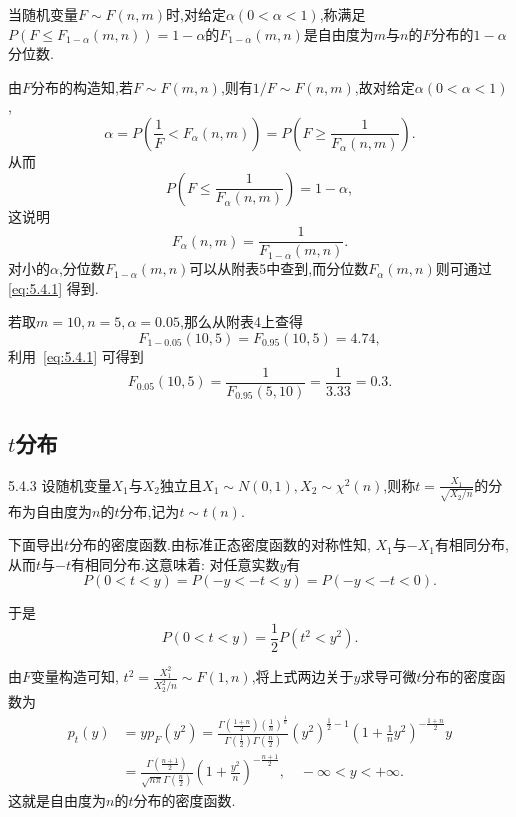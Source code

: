 当随机变量$F\sim F(n,m)$时,对给定$\alpha(0<\alpha<1)$,称满足$P(F\leq F_{1-\alpha}(m,n))=1-\alpha$的$F_{1-\alpha}(m,n)$是自由度为$m$与$n$的$F$分布的$1-\alpha$分位数.

由$F$分布的构造知,若$F\sim F(m,n)$,则有$1/F\sim F(n,m)$,故对给定$\alpha(0<\alpha<1)$,
\[
\alpha =P\left( \frac{1}{F}<F_{\alpha}\left( n,m \right) \right) =P\left( F\geq \frac{1}{F_{\alpha}\left( n,m \right)} \right).
\]
从而
\[
P\left( F\leq \frac{1}{F_{\alpha}\left( n,m \right)} \right) =1-\alpha,
\]
这说明
\begin{equation}\label{eq:5.4.1}
F_\alpha(n,m)=\frac1{F_{1-\alpha}(m,n)}.
\end{equation}
对小的$\alpha$,分位数$F_{1-\alpha}(m,n)$可以从附表5中查到,而分位数$F_\alpha(m,n)$则可通过 \eqref{eq:5.4.1} 得到.
\begin{example}\label{exam:5.4.1}
若取$m=10,n=5,\alpha=0.05$,那么从附表4上查得
\[F_{1-0.05}(10,5)=F_{0.95}(10,5)=4.74,\]
利用~\eqref{eq:5.4.1} 可得到
\[F_{0.05}(10,5)=\frac1{F_{0.95}(5,10)}=\frac1{3.33}=0.3.\]
\end{example}
\subsection{$t$分布\label{eq:5.4.3}}
\begin{definition}{}{5.4.3}
设随机变量$X_1$与$X_2$独立且$X_1\sim N(0,1),X_2\sim\chi^2(n)$,则称$t=\frac{X_1}{\sqrt{X_2/n}}$的分布为自由度为$n$的$t$分布,记为$t\sim t(n)$.
\end{definition}

下面导出$t$分布的密度函数.由标准正态密度函数的对称性知, $X_1$与$-X_1$有相同分布,从而$t$与$-t$有相同分布.这意味着: 对任意实数$y$有
\[P(0<t<y)=P(-y<-t<y)=P(-y<-t<0).\]

于是
\[P(0<t<y)=\frac12P(t^2<y^2).\]

由$F$变量构造可知, $t^2=\frac{X_1^2}{X_2^2/n}\sim F(1,n)$,将上式两边关于$y$求导可微$t$分布的密度函数为
\begin{align*}
p_t(y)&=yp_F(y^2)=\frac{\Gamma \left( \frac{1+n}{2} \right) \left( \frac{1}{n} \right) ^{\frac{1}{n}}}{\Gamma \left( \frac{1}{2} \right) \Gamma \left( \frac{n}{2} \right)}\left( y^2 \right) ^{\frac{1}{2}-1}\left( 1+\frac{1}{n}y^2 \right) ^{-\frac{1+n}{2}}y\\
&=\frac{\Gamma \left( \frac{n+1}{2} \right)}{\sqrt{n\pi}\Gamma \left( \frac{n}{2} \right)}\left( 1+\frac{y^2}{n} \right) ^{-\frac{n+1}{2}},\quad -\infty<y<+\infty.
\end{align*}
这就是自由度为$n$的$t$分布的密度函数.

